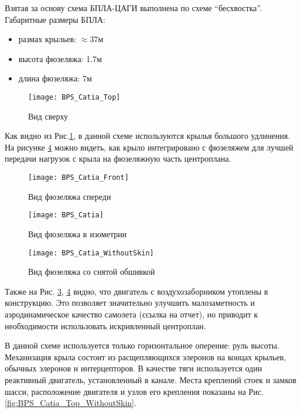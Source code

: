 Взятая за основу схема БПЛА-ЦАГИ выполнена по схеме ``бесхвостка''. Габаритные размеры БПЛА: 
\begin{itemize}
\item размах крыльев: $\approx37\text{м}$
\item высота фюзеляжа: 1.7м
\item длина фюзеляжа: 7м
\end{itemize}


\begin{figure}[H]
\centering
\texttt{[image: BPS\_Catia\_Top]}
\caption{Вид сверху}
\label{fig:BPS_Catia_Top}
\end{figure}

Как видно из Рис.\ref{fig:BPS_Catia_Top}, в данной схеме используются крылья большого удлинения. На рисунке \ref{fig:BPS_Catia_WithoutSkin} можно видеть, как крыло интегрировано с фюзеляжем для лучшей передачи нагрузок с крыла на фюзеляжную часть центроплана.


\begin{figure}[H]
\centering
\texttt{[image: BPS\_Catia\_Front]}
\caption{Вид фюзеляжа спереди}
\label{fig:BPS_Catia_Front}
\end{figure}




\begin{figure}[H]
\centering
\texttt{[image: BPS\_Catia]}
\caption{Вид фюзеляжа в изометрии}
\label{fig:BPS_Catia}
\end{figure}

\begin{figure}[H]
\centering
\texttt{[image: BPS\_Catia\_WithoutSkin]}
\caption{Вид фюзеляжа со снятой обшивкой}
\label{fig:BPS_Catia_WithoutSkin}
\end{figure}

Также на Рис. \ref{fig:BPS_Catia}, \ref{fig:BPS_Catia_WithoutSkin} видно, что двигатель с воздухозаборником утоплены в конструкцию. Это позволяет значительно улучшить малозаметность и аэродинамическое качество самолета (ссылка на отчет), но приводит к необходимости использовать искривленный центроплан. 

В данной схеме используется только горизонтальное оперение: руль высоты. Механизация крыла состоит из расщепляющихся элеронов на концах крыльев, обычных элеронов и интерцепторов. В качестве тяги используется один реактивный двигатель, установленный в канале. Места креплений стоек и замков шасси, расположение двигателя и узлов его крепления показаны на Рис. \ref{fig:BPS_Catia_Top_WithoutSkin}. 


